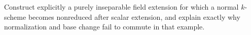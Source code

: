 \begin{problem}\label{chal:vi28-05}
Construct explicitly a purely inseparable field extension for which a normal $k$-scheme becomes nonreduced after scalar extension, and explain exactly why normalization and base change fail to commute in that example.
\end{problem}
